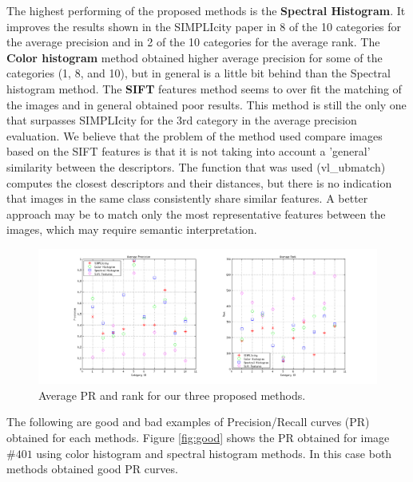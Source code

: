 \documentclass[a4paper,12pt]{article}
\begin{document}
The highest performing of the proposed methods is the \textbf{Spectral Histogram}. It improves the results shown in 
the SIMPLIcity paper in 8 of the 10 categories for the average precision and in 2 
of the 10 categories for the average rank. The \textbf{Color histogram} method obtained
higher average precision for some of the categories (1, 8, and 10), but in general is 
a little bit behind than the Spectral histogram method. The \textbf{SIFT} features 
method seems to over fit the matching of the images and in general obtained poor results. 
This method is still the only one that surpasses SIMPLIcity for the 3rd category in the average precision
evaluation. We believe that the problem of the method used compare images based on the
SIFT features is that it is not taking into account a 'general' similarity between the descriptors. 
The function that was used (vl\_ubmatch) computes the closest descriptors and their distances, but there is no indication that images in the same class consistently share similar features. A better approach may 
be to match only the most representative features between the images, which may require semantic interpretation. 

\begin{figure}[h!]
    \centering
    \includegraphics[totalheight=.28\textheight]{./Images/AllResults.png}
    \caption{Average PR and rank for our three proposed methods.}
    \label{fig:res}
\end{figure}

The following are good and bad examples of Precision/Recall curves (PR) obtained for each methods. Figure \ref{fig:good} shows the PR obtained for image $\#401$ using 
color histogram and spectral histogram methods. In this case both methods obtained good PR curves. 
\end{document}
